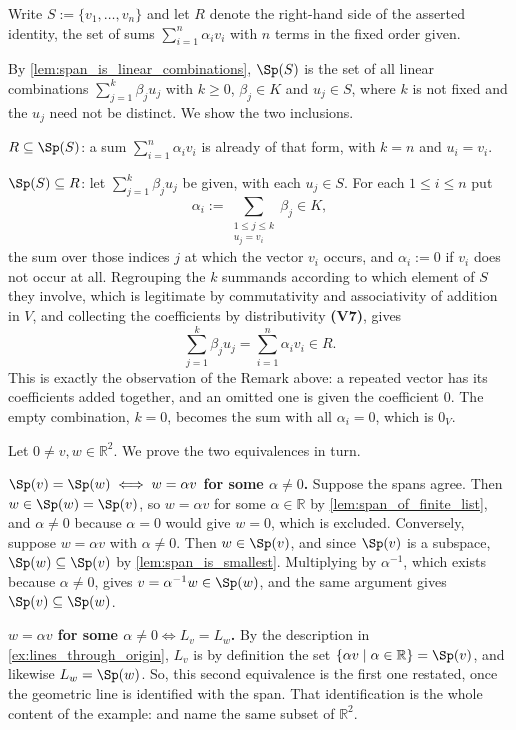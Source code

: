 \begin{exercisesolution}
\label{sol:span_of_finite_list}
Write $S := \{v_1, \dots, v_n\}$ and let $R$ denote the right-hand side of the asserted identity, the set of sums $\sum_{i=1}^n \alpha_i v_i$ with $n$ terms in the fixed order given.

By \cref{lem:span_is_linear_combinations}, $\Sp(S)$ is the set of all linear combinations $\sum_{j=1}^{k} \beta_j u_j$ with $k \ge 0$, $\beta_j \in K$ and $u_j \in S$, where $k$ is not fixed and the $u_j$ need not be distinct. We show the two inclusions.

$R \subseteq \Sp(S)$: a sum $\sum_{i=1}^n \alpha_i v_i$ is already of that form, with $k = n$ and $u_i = v_i$.

$\Sp(S) \subseteq R$: let $\sum_{j=1}^{k} \beta_j u_j$ be given, with each $u_j \in S$. For each $1 \le i \le n$ put
\[
    \alpha_i := \sum_{\substack{1 \le j \le k \\ u_j = v_i}} \beta_j \in K,
\]
the sum over those indices $j$ at which the vector $v_i$ occurs, and $\alpha_i := 0$ if $v_i$ does not occur at all. Regrouping the $k$ summands according to which element of $S$ they involve, which is legitimate by commutativity and associativity of addition in $V$, and collecting the coefficients by distributivity \textbf{(V7)}, gives
\[
    \sum_{j=1}^{k} \beta_j u_j = \sum_{i=1}^{n} \alpha_i v_i \in R.
\]
This is exactly the observation of the Remark above: a repeated vector has its coefficients added together, and an omitted one is given the coefficient $0$. The empty combination, $k = 0$, becomes the sum with all $\alpha_i = 0$, which is $0_V$.
\end{exercisesolution}

\begin{exercisesolution}
\label{sol:same_span_same_line}
Let $0 \ne v, w \in \mathbb{R}^2$. We prove the two equivalences in turn.

\textbf{$\Sp(v) = \Sp(w) \iff w = \alpha v$ for some $\alpha \ne 0$.} Suppose the spans agree. Then $w \in \Sp(w) = \Sp(v)$, so $w = \alpha v$ for some $\alpha \in \mathbb{R}$ by \cref{lem:span_of_finite_list}, and $\alpha \ne 0$ because $\alpha = 0$ would give $w = 0$, which is excluded. Conversely, suppose $w = \alpha v$ with $\alpha \ne 0$. Then $w \in \Sp(v)$, and since $\Sp(v)$ is a subspace, $\Sp(w) \subseteq \Sp(v)$ by \cref{lem:span_is_smallest}. Multiplying by $\alpha^{-1}$, which exists because $\alpha \ne 0$, gives $v = \alpha^{-1} w \in \Sp(w)$, and the same argument gives $\Sp(v) \subseteq \Sp(w)$.

\textbf{$w = \alpha v$ for some $\alpha \ne 0 \iff L_v = L_w$.} By the description in \cref{ex:lines_through_origin}, $L_v$ is by definition the set $\{\alpha v \mid \alpha \in \mathbb{R}\} = \Sp(v)$, and likewise $L_w = \Sp(w)$. So, this second equivalence is the first one restated, once the geometric line is identified with the span. That identification is the whole content of the example:  and  name the same subset of $\mathbb{R}^2$.
\end{exercisesolution}

